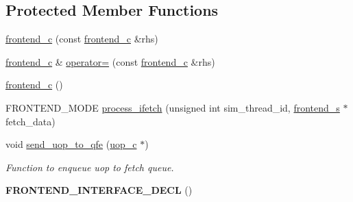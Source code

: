 \subsection*{Protected Member Functions}
\begin{DoxyCompactItemize}
\item 
\hyperlink{classfrontend__c_a393e6922087b7d7237544467eaa6986d}{frontend\_\-c} (const \hyperlink{classfrontend__c}{frontend\_\-c} \&rhs)
\item 
\hyperlink{classfrontend__c}{frontend\_\-c} \& \hyperlink{classfrontend__c_a52d74eb2635b3b037dd8ec7c5635544b}{operator=} (const \hyperlink{classfrontend__c}{frontend\_\-c} \&rhs)
\item 
\hyperlink{classfrontend__c_a4fb5b788cb0f4cb4ba859ffdb2366e6f}{frontend\_\-c} ()
\item 
FRONTEND\_\-MODE \hyperlink{classfrontend__c_a5de715a12e87c609121b884ebc880a27}{process\_\-ifetch} (unsigned int sim\_\-thread\_\-id, \hyperlink{structfrontend__s}{frontend\_\-s} $\ast$fetch\_\-data)
\item 
void \hyperlink{classfrontend__c_a63e6c5516b994e8a36f466bc8dedf166}{send\_\-uop\_\-to\_\-qfe} (\hyperlink{classuop__c}{uop\_\-c} $\ast$)
\begin{DoxyCompactList}\small\item\em Function to enqueue uop to fetch queue. \item\end{DoxyCompactList}\item 
\hypertarget{classfrontend__c_a76d91633c35b03beb82d616f1ff419bd}{
{\bfseries FRONTEND\_\-INTERFACE\_\-DECL} ()}
\label{classfrontend__c_a76d91633c35b03beb82d616f1ff419bd}

\end{DoxyCompactItemize}
